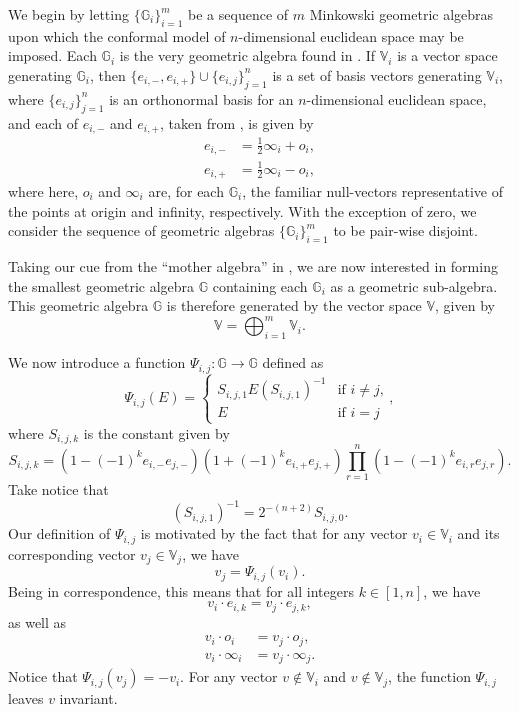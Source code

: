 \documentclass{ecgd-l}
\theoremstyle{definition}
\theoremstyle{remark}
\numberwithin{equation}{section}
\newcommand{\G}{\mathbb{G}}
\newcommand{\V}{\mathbb{V}}
\newcommand{\nvai}{\infty}
\newcommand{\nvao}{o}
\begin{document}
We begin by letting $\{\G_i\}_{i=1}^m$ be a sequence of $m$ Minkowski geometric algebras upon
which the conformal model of $n$-dimensional euclidean space may be imposed.
Each $\G_i$ is the very geometric algebra found in \cite{Hestenes01}.  If $\V_i$ is a vector space
generating $\G_i$, then $\{e_{i,-},e_{i,+}\}\cup\{e_{i,j}\}_{j=1}^n$ is a set of basis
vectors generating $\V_i$, where $\{e_{i,j}\}_{j=1}^n$ is an orthonormal basis
for an $n$-dimensional euclidean space, and each of $e_{i,-}$ and $e_{i,+}$, taken from \cite{LiRockwood01}, is given by
\begin{align*}
e_{i,-} &= \frac{1}{2}\nvai_i + \nvao_i, \\
e_{i,+} &= \frac{1}{2}\nvai_i - \nvao_i,
\end{align*}
where here, $\nvao_i$ and $\nvai_i$ are, for each $\G_i$, the familiar null-vectors
representative of the points at origin and infinity, respectively.
With the exception of zero, we consider the sequence of geometric algebras $\{\G_i\}_{i=1}^m$
to be pair-wise disjoint.

Taking our cue from the ``mother algebra'' in \cite{DoranHestenes93},
we are now interested in forming the smallest geometric algebra $\G$
containing each $\G_i$ as a geometric sub-algebra.  This geometric
algebra $\G$ is therefore generated by the vector space $\V$, given by
\begin{equation*}
\V=\bigoplus_{i=1}^m \V_i.
\end{equation*}

We now introduce a function $\Psi_{i,j}:\G\to\G$ defined as
\begin{equation*}
\Psi_{i,j}(E) = \left\{\begin{array}{ll}
S_{i,j,1}E(S_{i,j,1})^{-1} & \mbox{if $i\neq j$,} \\
E & \mbox{if $i=j$}\end{array}\right.,
\end{equation*}
where $S_{i,j,k}$ is the constant given by
\begin{equation}\label{equ_S}
S_{i,j,k} = \left(1-(-1)^ke_{i,-}e_{j,-}\right)\left(1+(-1)^ke_{i,+}e_{j,+}\right)\prod_{r=1}^n\left(1-(-1)^ke_{i,r}e_{j,r}\right).
\end{equation}
Take notice that
\begin{equation*}
(S_{i,j,1})^{-1} = 2^{-(n+2)}S_{i,j,0}.
\end{equation*}
Our definition of $\Psi_{i,j}$ is motivated by the fact that for any vector $v_i\in\V_i$ and its
corresponding vector $v_j\in\V_j$, we have
\begin{equation*}
v_j = \Psi_{i,j}(v_i).
\end{equation*}
Being in correspondence, this means that for all integers $k\in[1,n]$,
we have
\begin{equation*}
v_i\cdot e_{i,k}=v_j\cdot e_{j,k},
\end{equation*}
as well as
\begin{align*}
v_i\cdot\nvao_i &= v_j\cdot\nvao_j, \\
v_i\cdot\nvai_i &= v_j\cdot\nvai_j.
\end{align*}
Notice that $\Psi_{i,j}(v_j)=-v_i$.
For any vector $v\not\in\V_i$ and $v\not\in\V_j$, the function $\Psi_{i,j}$ leaves $v$ invariant.
\end{document}
